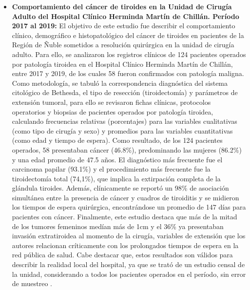 \begin{itemize}
    \item \textbf{Comportamiento del cáncer de tiroides en la Unidad de Cirugía Adulto del Hospital Clínico Herminda Martín de Chillán. Período 2017 al 2019:} El objetivo de este estudio fue describir el comportamiento clínico, demográfico e histopatológico del cáncer de tiroides en pacientes de la Región de Ñuble sometidos a resolución quirúrgica en la unidad de cirugía adulto. Para ello, se analizaron los registros clínicos de 124 pacientes operados por patología tiroidea en el Hospital Clínico Herminda Martín de Chillán, entre 2017 y 2019, de los cuales 58 fueron confirmados con patología maligna. Como metodología, se tabuló la correspondencia diagnóstica del sistema citológico de Bethesda, el tipo de resección (tiroidectomía) y parámetros de extensión tumoral, para ello se revisaron fichas clínicas, protocolos operatorios y biopsias de pacientes operados por patología tiroidea, calculando frecuencias relativas (porcentajes) para las variables cualitativas (como tipo de cirugía y sexo) y promedios para las variables cuantitativas (como edad y tiempo de espera). Como resultado, de los 124 pacientes operados, 58 presentaban cáncer (46.8\%), predominando las mujeres (86.2\%) y una edad promedio de 47.5 años. El diagnóstico más frecuente fue el carcinoma papilar (93.1\%) y el procedimiento más frecuente fue la tiroidectomía total (74,1\%), que implica la extirpación completa de la glándula tiroides. Además, clínicamente se reportó un 98\% de asociación simultánea entre la presencia de cáncer y cuadros de tiroiditis y se midieron los tiempos de espera quirúrgica, encontrándose un promedio de 147 días para pacientes con cáncer. Finalmente, este estudio destaca que más de la mitad de los tumores femeninos medían más de 1cm y el 36\% ya presentaban invasión extratiroidea al momento de la cirugía, variables de extensión que los autores relacionan críticamente con los prolongados tiempos de espera en la red pública de salud. Cabe destacar que, estos resultados son válidos para describir la realidad local del hospital, ya que se trató de un estudio censal de la unidad, considerando a todos los pacientes operados en el período, sin error de muestreo \cite{scielo3}.

\end{itemize}
